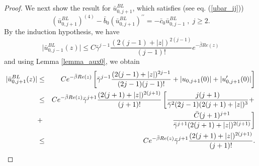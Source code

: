 \documentclass[10pt,a4paper]{amsart}
\begin{document}
\begin{proof}
%
We next show the result for $\bar{u}^{BL}_{0,j+1}$, which satisfies (see eq. (\ref{ubar_ij}))
\[
\left(\bar{u}^{BL}_{0,j+1}\right)^{(4)}-\bar{b}_{0}\left(\bar{u}^{BL}_{0,j+1}\right)^{\prime \prime }=-\bar{c}_{0}\bar{u}^{BL}_{0,j-1} \; , \; j\geq 2.
\]
%
By the induction hypothesis, we have
%
\[
\vert \bar{u}^{BL}_{0,j-1} (z) \vert \leq C \bar{\gamma }^{j-1} \frac{(2(j-1)+|z|)^{2(j-1)}}{(j-1)!} e^{-\bar{\beta} Re(z)}
\]
and using Lemma \ref{lemma_aux0}, we obtain
%
\begin{eqnarray*}
\vert \bar{u}^{BL}_{0,j+1} (z) \vert &\leq& C e^{-\bar{\beta} Re(z)} \left[ \bar{\gamma}^{j-1} \frac{(2(j-1)+|z|)^{2j-1}}{(2j-1) (j-1)!} +
|u_{0,j+1}(0)| + |u'_{0,j+1}(0)| \right]  \notag \\
&\leq& C e^{-\bar{\beta} Re(z)} \bar{\gamma}^{j+1} \frac{(2(j+1)+|z|)^{2(j+1)}}{(j+1)!} \left[ \frac{j(j+1)}{\bar{\gamma}^2 (2j-1) (2(j+1)+|z|)^3} + \right. \\
&+& \left. \frac{\bar{C} (j+1)^{j+1}}{\bar{\gamma}^{j+1} (2(j+1)+|z|)^{2(j+1)}} \right] \\
&\leq& C e^{-\bar{\beta} Re(z)} \bar{\gamma}^{j+1} \frac{(2(j+1)+|z|)^{2(j+1)}}{(j+1)!}.
\end{eqnarray*}
%


\end{proof}
\end{document}
